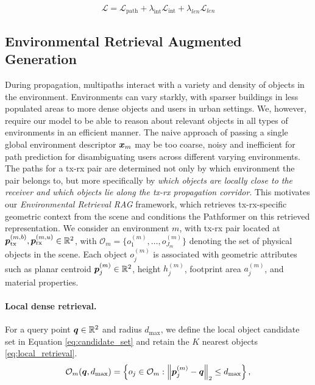\begin{equation}
\mathcal{L}
=
\mathcal{L}_{\mathrm{path}}
+
\lambda_{\mathrm{int}}\mathcal{L}_{\mathrm{int}}
+
\lambda_{len}\mathcal{L}_{len}
\label{eq:total_loss}
\end{equation}

\subsection{Environmental Retrieval Augmented Generation}
\label{subsec:env_rag}

During propagation, multipaths interact with a variety and density of objects in the environment. Environments can vary starkly, with sparser buildings in less populated areas to more dense objects and users in urban settings. We, however, require our model to be able to reason about relevant objects in all types of environments in an efficient manner.
The naive approach of passing a single global environment descriptor $\boldsymbol{x}_m$ may be too coarse, noisy and inefficient for path prediction for disambiguating users across different varying environments. The paths for a tx-rx pair are determined not only by which environment the pair belongs to, but more specifically by \emph{which objects are locally close to the receiver and which objects lie along the tx-rx propagation corridor}. This motivates our \emph{Environmental Retrieval RAG} framework, which retrieves tx-rx-specific geometric context from the scene and conditions the Pathformer on this retrieved representation. We consider an environment $m$, with tx-rx pair located at $\boldsymbol{p}^{(m,b)}_{\mathrm{tx}}, \boldsymbol{p}^{(m,u)}_{\mathrm{rx}} \in \mathbb{R}^2$, with   $\mathcal{O}_m=\{o^{(m)}_1,\dots,o^{(m)}_{J_m}\}$
denoting the set of physical objects in the scene. Each object $o^{(m)}_j$ is associated with geometric attributes such as planar centroid $\boldsymbol{p}^{(m)}_j\in\mathbb{R}^2$, height $h^{(m)}_j$, footprint area $a^{(m)}_j$, and material properties.

\paragraph{Local dense retrieval.}
For a query point $\boldsymbol{q}\in\mathbb{R}^2$ and radius $d_{\max}$, we define the local object candidate set in Equation \ref{eq:candidate_set} and retain the $K$ nearest objects \ref{eq:local_retrieval}.
\begin{equation}
\mathcal{O}_{m}(\boldsymbol{q}, d_{\max})
=
\left\{
o_j \in \mathcal{O}_m :
\left\|
\boldsymbol{p}^{(m)}_j-\boldsymbol{q}
\right\|_2 \le d_{\max}
\right\},
\label{eq:candidate_set}
\end{equation}

